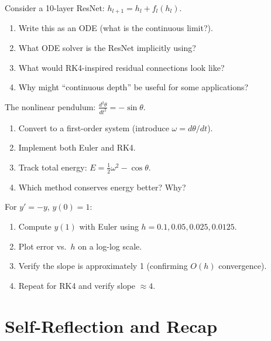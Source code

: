 \vspace{2em}
 Consider a 10-layer ResNet: $h_{l+1} = h_l + f_l(h_l)$.

\begin{enumerate}[label=(\alph*)]
    \item Write this as an ODE (what is the continuous limit?).
    \item What ODE solver is the ResNet implicitly using?
    \item What would RK4-inspired residual connections look like?
    \item Why might ``continuous depth'' be useful for some applications?
\end{enumerate}


\vspace{2em}
 The nonlinear pendulum: $\frac{d^2\theta}{dt^2} = -\sin\theta$.

\begin{enumerate}[label=(\alph*)]
    \item Convert to a first-order system (introduce $\omega = d\theta/dt$).
    \item Implement both Euler and RK4.
    \item Track total energy: $E = \frac{1}{2}\omega^2 - \cos\theta$.
    \item Which method conserves energy better? Why?
\end{enumerate}


\vspace{2em}
 For $y' = -y$, $y(0) = 1$:
\begin{enumerate}[label=(\alph*)]
    \item Compute $y(1)$ with Euler using $h = 0.1, 0.05, 0.025, 0.0125$.
    \item Plot error vs.\ $h$ on a log-log scale.
    \item Verify the slope is approximately 1 (confirming $O(h)$ convergence).
    \item Repeat for RK4 and verify slope $\approx 4$.
\end{enumerate}




\newpage
\section{Self-Reflection and Recap}

